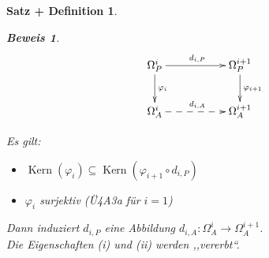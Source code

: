 \documentclass[a4paper,12pt]{scrbook}
\theoremstyle{break}
\newtheorem{SatzDef}[Satz]{Satz + Definition}
\theoremstyle{nonumberbreak}
\newtheorem{Bew}{Beweis}
\theoremstyle{nonumberplain}
\DeclareMathOperator{\Kern}{Kern}
\begin{document}
\begin{SatzDef}
\begin{Bew}
\[
\begin{xy}
\xymatrix{
\Omega_P^i\ar[rr]^{d_{i,P}}\ar[d]^{\varphi_i}&&\Omega_P^{i+1}\ar[d]^{\varphi_{i+1}}\\
\Omega_A^i\ar@{-->}[rr]^{d_{i,A}}&&\Omega_A^{i+1}\\
}
\end{xy}
\]

Es gilt: 
\begin{itemize}
\item $\Kern(\varphi_i)\subseteq \Kern(\varphi_{i+1}\circ d_{i,P})$
\item $\varphi_i$ surjektiv (Ü4A3a für $i=1$)
\end{itemize}

Dann induziert $d_{i,P}$ eine Abbildung $d_{i,A}: \Omega_A^{i}\to \Omega_A^{i+1}$.\\
Die Eigenschaften (i) und (ii) werden ,,vererbt``.

\end{Bew}
\end{SatzDef}
\end{document}
